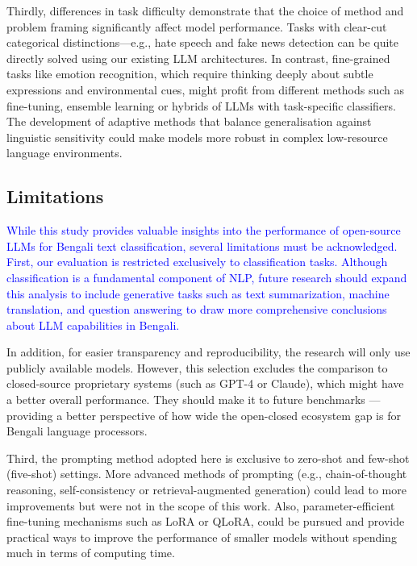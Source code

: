 \documentclass[10pt,letterpaper]{article}
\newcommand{\rev}[1]{\textcolor{blue}{#1}}
\begin{document}
Thirdly, differences in task difficulty demonstrate that the choice of method and problem framing significantly affect model performance. Tasks with clear-cut categorical distinctions—e.g., hate speech and fake news detection can be quite directly solved using our existing LLM architectures. In contrast, fine-grained tasks like emotion recognition, which require thinking deeply about subtle expressions and environmental cues, might profit from different methods such as fine-tuning, ensemble learning or hybrids of LLMs with task-specific classifiers. The development of adaptive methods that balance generalisation against linguistic sensitivity could make models more robust in complex low-resource language environments.


\subsection*{Limitations}

\rev{While this study provides valuable insights into the performance of open-source LLMs for Bengali text classification, several limitations must be acknowledged. First, our evaluation is restricted exclusively to classification tasks. Although classification is a fundamental component of NLP, future research should expand this analysis to include generative tasks such as text summarization, machine translation, and question answering to draw more comprehensive conclusions about LLM capabilities in Bengali.}

In addition, for easier transparency and reproducibility, the research will only use publicly available models. However, this selection excludes the comparison to closed-source proprietary systems (such as GPT-4 or Claude), which might have a better overall performance. They should make it to future benchmarks — providing a better perspective of how wide the open-closed ecosystem gap is for Bengali language processors.

Third, the prompting method adopted here is exclusive to zero-shot and few-shot (five-shot) settings. More advanced methods of prompting (e.g., chain-of-thought reasoning, self-consistency or retrieval-augmented generation) could lead to more improvements but were not in the scope of this work. Also, parameter-efficient fine-tuning mechanisms such as LoRA or QLoRA, could be pursued and provide practical ways to improve the performance of smaller models without spending much in terms of computing time.
\end{document}
